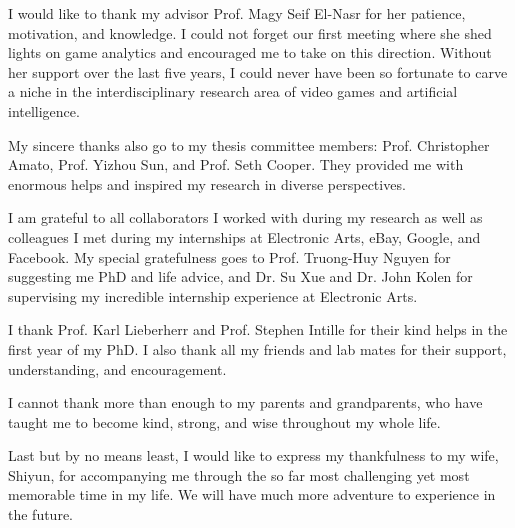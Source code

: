 \documentclass[
11pt, %
english, %
doublespacing, %
headsepline, %
]{MastersDoctoralThesis} %
\begin{document}
\begin{acknowledgements}
\addchaptertocentry{\acknowledgementname} %
I would like to thank my advisor Prof. Magy Seif El-Nasr for her patience, motivation, and knowledge. I could not forget our first meeting where she shed lights on game analytics and encouraged me to take on this direction. Without her support over the last five years, I could never have been so fortunate to carve a niche in the interdisciplinary research area of video games and artificial intelligence.

My sincere thanks also go to my thesis committee members: Prof. Christopher Amato, Prof. Yizhou Sun, and Prof. Seth Cooper. They provided me with enormous helps and inspired my research in diverse perspectives. 

I am grateful to all collaborators I worked with during my research as well as colleagues I met during my internships at Electronic Arts, eBay, Google, and Facebook. My special gratefulness goes to Prof. Truong-Huy Nguyen for suggesting me PhD and life advice, and Dr. Su Xue and Dr. John Kolen for supervising my incredible internship experience at Electronic Arts.

I thank Prof. Karl Lieberherr and Prof. Stephen Intille for their kind helps in the first year of my PhD. I also thank all my friends and lab mates for their support, understanding, and encouragement.

I cannot thank more than enough to my parents and grandparents, who have taught me to become kind, strong, and wise throughout my whole life.

Last but by no means least, I would like to express my thankfulness to my wife, Shiyun, for accompanying me through the so far most challenging yet most memorable time in my life. We will have much more adventure to experience in the future.
\end{acknowledgements}


\tableofcontents %

\listoffigures %

\listoftables %

\end{document}
